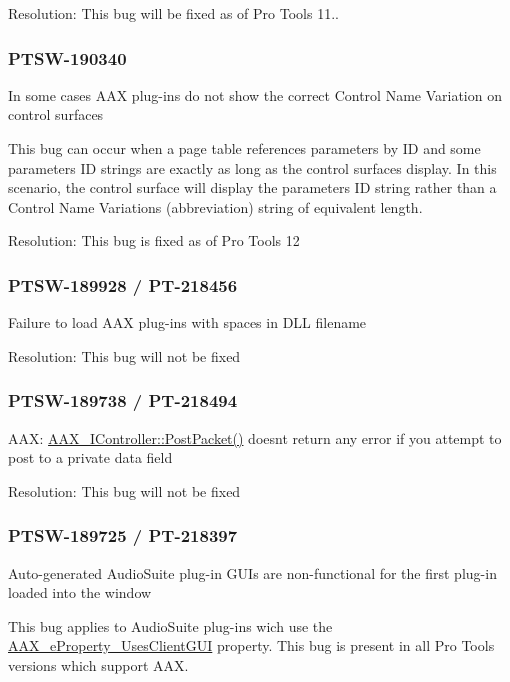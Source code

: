Resolution\+: This bug will be fixed as of Pro Tools 11..\hypertarget{a00846_PTSW-190340}{}\subsubsection{P\+T\+S\+W-\/190340}\label{a00846_PTSW-190340}
In some cases A\+AX plug-\/ins do not show the correct Control Name Variation on control surfaces

This bug can occur when a page table references parameters by ID and some parameters\textquotesingle{} ID strings are exactly as long as the control surface\textquotesingle{}s display. In this scenario, the control surface will display the parameter\textquotesingle{}s ID string rather than a Control Name Variations (abbreviation) string of equivalent length.

Resolution\+: This bug is fixed as of Pro Tools 12\hypertarget{a00846_PTSW-189928}{}\subsubsection{P\+T\+S\+W-\/189928 / P\+T-\/218456}\label{a00846_PTSW-189928}
Failure to load A\+AX plug-\/ins with spaces in D\+LL filename

Resolution\+: This bug will not be fixed\hypertarget{a00846_PTSW-189738}{}\subsubsection{P\+T\+S\+W-\/189738 / P\+T-\/218494}\label{a00846_PTSW-189738}
A\+AX\+: \mbox{\hyperlink{a01789_ae5dd2b5925dbc181513bca1c4ac5e716}{A\+A\+X\+\_\+\+I\+Controller\+::\+Post\+Packet()}} doesn\textquotesingle{}t return any error if you attempt to post to a private data field

Resolution\+: This bug will not be fixed\hypertarget{a00846_PTSW-189725}{}\subsubsection{P\+T\+S\+W-\/189725 / P\+T-\/218397}\label{a00846_PTSW-189725}
Auto-\/generated Audio\+Suite plug-\/in G\+U\+Is are non-\/functional for the first plug-\/in loaded into the window

This bug applies to Audio\+Suite plug-\/ins wich use the \mbox{\hyperlink{a00662_a13e384f22825afd3db6d68395b79ce0daf48412738dcfcc56046718d9e5a034d7}{A\+A\+X\+\_\+e\+Property\+\_\+\+Uses\+Client\+G\+UI}} property. This bug is present in all Pro Tools versions which support A\+AX.

